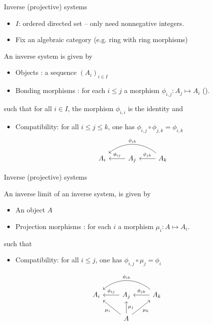 \documentclass[compress,11pt]{beamer}
\renewcommand{\emph}[1]{{\color{red} #1}}
\begin{document}
\begin{frame}[fragile]{Inverse (projective) systems}

  \begin{itemize}
  \item $I$: ordered directed set -- only need nonnegative integers.
  \item Fix an algebraic category (e.g. ring with ring morphisms)
  \end{itemize}
  \begin{DEFN}
    An \emph{inverse system} is given by
    \begin{itemize}
    \item Objects : a sequence $(A_i)_{i\in I}$
    \item Bonding morphisms : for each $i\leq j$ a morphism $\phi_{i,j}:
      A_j\mapsto A_i$ ().
    \end{itemize}
    such that for all $i\in I$, the morphism $\phi_{i,i}$ is the identity and
    \begin{itemize}
    \item Compatibility: for all $i \leq j \leq k$, one has
      $\phi_{i,j} \circ \phi_{j,k} = \phi_{i,k}$
      \vskip-3mm
\[
\begin{tikzcd}%
  A_{i}
  & A_{j} \arrow[l,"\phi_{ij}",swap]
  & A_{k} \arrow[l,"\phi_{jk}",swap] \arrow[ll,"\phi_{ik}",bend
  right=40,swap]
\end{tikzcd}
\]
\end{itemize}
  \end{DEFN}
\end{frame}

\begin{frame}[fragile]{Inverse (projective) systems}

  \begin{DEFN}
    An \emph{inverse limit} of an inverse system, is given by
    \begin{itemize}
    \item An object $A$
    \item Projection morphisms : for each $i$ a morphism $\mu_{i}:  A\mapsto
      A_i$.
    \end{itemize}
      such that
    \begin{itemize}
    \item Compatibility: for all $i \leq j$, one has
      $\phi_{i,j} \circ \mu_{j} = \phi_{i}$
    \end{itemize}
  \end{DEFN}
\[
\begin{tikzcd}%
  A_{i}
  & A_{j} \arrow[l,"\phi_{ij}",swap]
  & A_{k} \arrow[l,"\phi_{jk}",swap] \arrow[ll,"\phi_{ik}",bend
  right=40,swap]\\
  & A \arrow[ul,"\mu_{i}"] \arrow[u,"\mu_{j}",swap]
  \arrow[ur,"\mu_{k}",swap]
\end{tikzcd}
\]

\end{frame}
\end{document}
